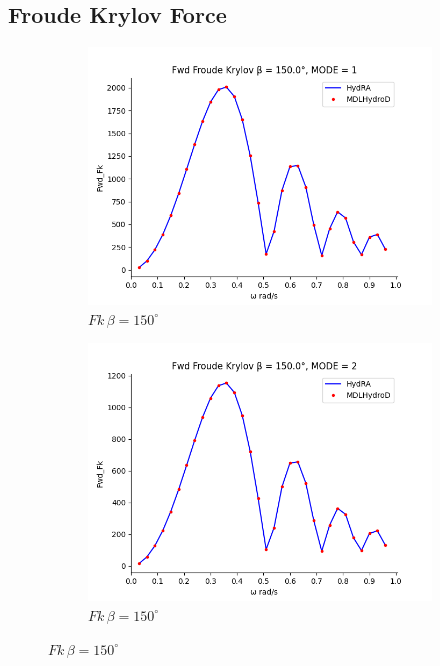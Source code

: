 \subsection{Froude Krylov Force}
\begin{figure}[H]
    \centering
    \begin{subfigure}[b]{0.45\textwidth}
        \includegraphics[width=\textwidth]{plots/kvlcc/fk/fk1.png}
        \caption{$Fk \, \beta = 150^{\circ}$}
    \end{subfigure}
    \begin{subfigure}[b]{0.45\textwidth}
        \includegraphics[width=\textwidth]{plots/kvlcc/fk/fk2.png}
        \caption{$Fk \, \beta = 150^{\circ}$}
    \end{subfigure}

\end{figure}
